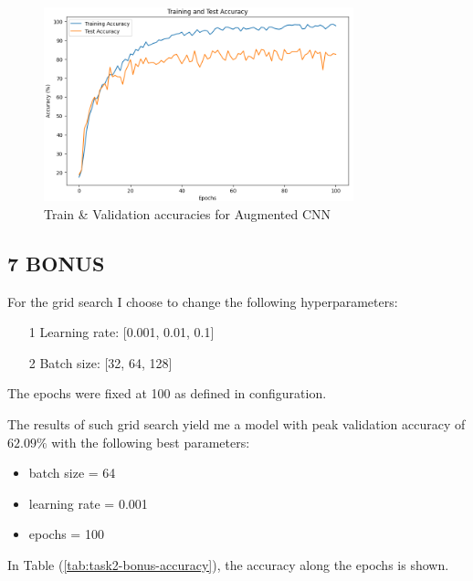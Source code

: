 \documentclass[11pt]{scrartcl}
\begin{document}
\begin{figure}[htbp]
\centering
\includegraphics[width=0.8\textwidth]{./figures/task2-aug-accuracy.png}
\caption{Train \& Validation accuracies for Augmented CNN}
\label{fig:task2-aug-accuracy}
\end{figure}


\subsection*{7 BONUS}

For the grid search I choose to change the following hyperparameters:
\begin{itemize}
	\item[1] Learning rate: [0.001, 0.01, 0.1]
	\item[2] Batch size: [32, 64, 128]
\end{itemize}

The epochs were fixed at 100 as defined in configuration.

The results of such grid search yield me a model with peak validation accuracy of
\( 62.09 \% \)
with the following best parameters:

\begin{itemize}
	\item batch size = 64
	\item learning rate = 0.001
	\item epochs = 100
\end{itemize}

In Table (\ref{tab:task2-bonus-accuracy}), the accuracy along the epochs is shown.
\end{document}
